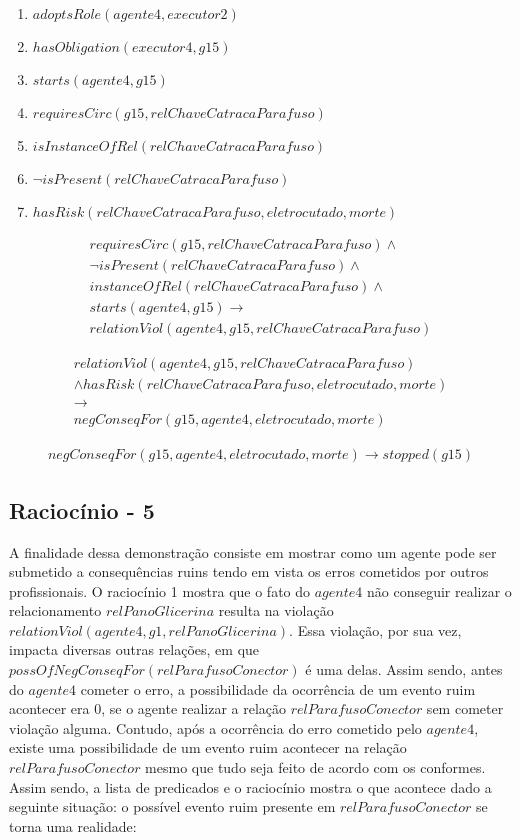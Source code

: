 \begin{enumerate}
	\item $adoptsRole(agente4,executor2)$
	\item $hasObligation(executor4,g15)$	
	\item $starts(agente4,g15)$ 
	\item $requiresCirc(g15,relChaveCatracaParafuso)$
	\item $isInstanceOfRel(relChaveCatracaParafuso)$	
	\item $\neg isPresent(relChaveCatracaParafuso)$
	\item $hasRisk(relChaveCatracaParafuso,eletrocutado,morte)$
\end{enumerate}

\begin{eqnarray}
	requiresCirc(g15,relChaveCatracaParafuso)\wedge \nonumber \\
	\neg isPresent(relChaveCatracaParafuso) \wedge \nonumber \\
	instanceOfRel(relChaveCatracaParafuso) \wedge \nonumber \\
	starts(agente4,g15) \to \nonumber \\
	relationViol(agente4,g15,relChaveCatracaParafuso) \nonumber
\end{eqnarray}

\begin{eqnarray}\nonumber
	relationViol(agente4,g15,relChaveCatracaParafuso) \nonumber \\ 
	 \wedge hasRisk(relChaveCatracaParafuso,eletrocutado,morte) \nonumber \\ 
	\to \nonumber \\ 
	negConseqFor(g15,agente4,eletrocutado,morte)
\end{eqnarray}

\begin{eqnarray}
		negConseqFor(g15,agente4,eletrocutado,morte) \to stopped(g15)
\end{eqnarray}

\subsection{Raciocínio - 5} 
\label{raciocinio5}
A finalidade dessa demonstração consiste em mostrar como um agente pode ser submetido a consequências ruins tendo em vista os erros cometidos por outros profissionais. O raciocínio 1 mostra que o fato do $agente4$ não conseguir realizar o relacionamento $relPanoGlicerina$ resulta na violação $relationViol(agente4,g1,relPanoGlicerina)$. Essa violação, por sua vez, impacta diversas outras relações, em que $possOfNegConseqFor(relParafusoConector)$ é uma delas. Assim sendo, antes do $agente4$ cometer o erro, a possibilidade da ocorrência de um evento ruim acontecer era 0, se o agente realizar a relação $relParafusoConector$ sem cometer violação alguma. Contudo, após a ocorrência do erro cometido pelo $agente4$, existe uma possibilidade de um evento ruim acontecer na relação $relParafusoConector$ mesmo que tudo seja feito de acordo com os conformes. Assim sendo, a lista de predicados e o raciocínio mostra o que acontece dado a seguinte situação: o possível evento ruim presente em $relParafusoConector$ se torna uma realidade:  

